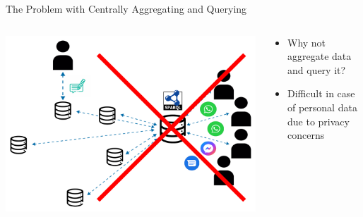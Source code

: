 \begin{frame}{The Problem with Centrally Aggregating and Querying}
    \begin{columns}[T] %
        \begin{column}{0.6\textwidth} %
            \includegraphics[width=\linewidth]{images/centralize-personal-data-stores-no.pdf} %
        \end{column}

        \begin{column}{0.4\textwidth} %
            \begin{itemize}
                \item Why not aggregate data and query it?
                \item Difficult in case of personal data due to privacy concerns
            \end{itemize}
        \end{column}
    \end{columns}
\end{frame}

